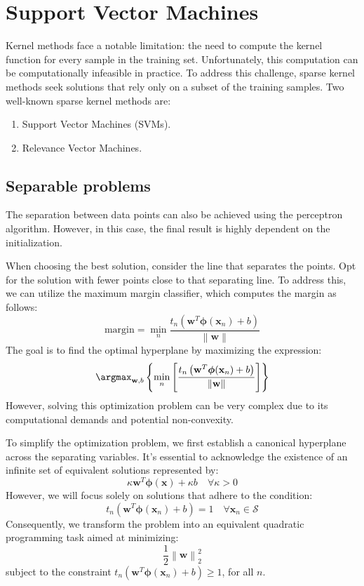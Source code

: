 \section{Support Vector Machines}

Kernel methods face a notable limitation: the need to compute the kernel function for every sample in the training set. 
Unfortunately, this computation can be computationally infeasible in practice. 
To address this challenge, sparse kernel methods seek solutions that rely only on a subset of the training samples.
Two well-known sparse kernel methods are:
\begin{enumerate}
    \item Support Vector Machines (SVMs).
    \item Relevance Vector Machines.
\end{enumerate}

\subsection{Separable problems}
The separation between data points can also be achieved using the perceptron algorithm. 
However, in this case, the final result is highly dependent on the initialization.

When choosing the best solution, consider the line that separates the points. 
Opt for the solution with fewer points close to that separating line.
To address this, we can utilize the maximum margin classifier, which computes the margin as follows:
\[\text{margin}=\min_n{\dfrac{t_n\left(\mathbf{w}^T\boldsymbol{\phi}(\mathbf{x}_n)+b\right)}{\left\lVert \mathbf{w}\right\rVert }}\]
The goal is to find the optimal hyperplane by maximizing the expression:
\[\argmax_{\mathbf{w},b}\left\{\min_n\left[\dfrac{t_n\left(\mathbf{w}^T\boldsymbol{\phi}(\mathbf{x}_n)+b\right)}{\left\lVert \mathbf{w}\right\rVert }\right]\right\}\]
However, solving this optimization problem can be very complex due to its computational demands and potential non-convexity.

To simplify the optimization problem, we first establish a canonical hyperplane across the separating variables. 
It's essential to acknowledge the existence of an infinite set of equivalent solutions represented by:
\[\kappa \textbf{w}^T\boldsymbol{\phi}(\textbf{x})+\kappa b \quad \forall\kappa>0\]
However, we will focus solely on solutions that adhere to the condition:
\[t_n\left(\mathbf{w}^T\boldsymbol{\phi}(\mathbf{x}_n)+b\right)=1\quad \forall\textbf{x}_n\in\mathcal{S}\]
Consequently, we transform the problem into an equivalent quadratic programming task aimed at minimizing:
\[\dfrac{1}{2}\left\lVert \textbf{w}\right\rVert_2^2 \]
subject to the constraint $t_n\left(\mathbf{w}^T\boldsymbol{\phi}(\mathbf{x}_n)+b\right)\geq 1$, for all $n$. 

